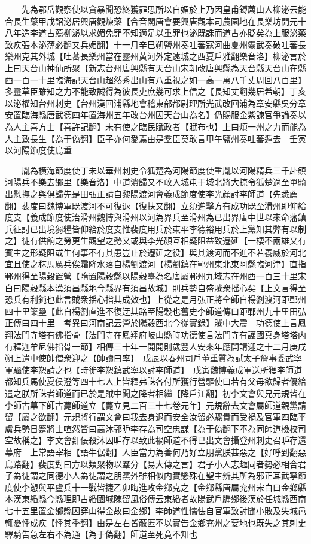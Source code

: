 　　先為鄂岳觀察使以貪暴聞恐終獲罪思所以自媚於上乃因皇甫鎛薦山人柳泌云能合長生藥甲戌詔泌居興唐觀煉藥【合音閣唐會要興唐觀本司農園地在長樂坊開元十八年造李道古薦柳泌以求媚免罪不知適足以重罪也泌既誅而道古亦貶矣為上服泌藥致疾張本泌薄必翻又兵媚翻】十一月辛巳朔鹽州奏吐蕃寇河曲夏州靈武奏破吐蕃長樂州克其外城【吐蕃長樂州當在靈州黄河外定遠城之西夏戶雅翻樂音洛】柳泌言於上曰天台山神仙所聚【新志台州唐興縣有天台山宋朝改唐興縣為天台縣天台山在縣西一百一十里臨海記天台山超然秀出山有八重視之如一高一萬八千丈周回八百里】多靈草臣雖知之力不能致誠得為彼長吏庶幾可求上信之【長知丈翻幾居希朝】丁亥以泌權知台州刺史【台州漢回浦縣地會稽東部都尉理所光武改回浦為章安縣吳分章安置臨海縣唐武德四年置海州五年改台州因天台山為名】仍賜服金紫諫官爭論奏以為人主喜方士【喜許記翻】未有使之臨民賦政者【賦布也】上曰煩一州之力而能為人主致長生【為于偽翻】臣子亦何愛焉由是羣臣莫敢言甲午鹽州奏吐蕃遁去　壬寅以河陽節度使烏重

　　胤為横海節度使丁未以華州刺史令狐楚為河陽節度使重胤以河陽精兵三千赴鎮河陽兵不樂去鄉里【樂音洛】中道潰歸又不敢入城屯于城北將大掠令狐楚適至單騎出慰撫之與俱歸先是田弘正請自黎陽渡河會義成節度使李光顔討李師道【先悉薦翻】裴度曰魏博軍既渡河不可復退【復扶又翻】立須進擊方有成功既至滑州即仰給度支【義成節度使治滑州魏博與滑州以河為界兵至滑州為已出界唐中世以來命藩鎮兵征討已出境芻糧皆仰給於度支惟裴度用兵於東平李德裕用兵於上黨知其弊有以制之】徒有供餉之勞更生觀望之勢又或與李光顔互相疑阻益致遷延【一棲不兩雄又有賓主之形疑阻或生何事不有其患豈止於遷延之役】與其渡河而不進不若養威於河北宜且使之秣馬厲兵俟霜降水落自楊劉渡河【楊劉鎮在鄆州東北東阿縣臨河津】直指鄆州得至陽穀置營【隋置陽穀縣以陽穀臺為名唐屬鄆州九域志在州西一百三十里宋白曰陽穀縣本漢須昌縣地今縣界有須昌故城】則兵勢自盛賊衆揺心矣【上文言得至恐兵有利鈍也此言賊衆揺心指其成效也】上從之是月弘正將全師自楊劉渡河距鄆州四十里築壘【此自楊劉直進不復迂其路至陽穀也舊史李師道傳曰距鄆州九十里田弘正傳曰四十里　考異曰河南記云營於陽穀西北今從實錄】賊中大震　功德使上言鳳翔法門寺塔有佛指骨【法門寺在鳳翔府岐山縣時功德使言法門寺有護國真身塔塔内有釋迦牟尼佛指骨一節】相傳三十年一開開則歲豐人安來年應開請迎之十二月庚戌朔上遣中使帥僧衆迎之【帥讀曰率】　戊辰以春州司戶董重質為試太子詹事委武寧軍驅使李愬請之也【時徙李愬鎮武寧以討李師道】　戊寅魏博義成軍送所獲李師道都知兵馬使夏侯澄等四十七人上皆釋弗誅各付所獲行營驅使曰若有父母欲歸者優給遣之朕所誅者師道而已於是賊中聞之降者相繼【降戶江翻】初李文會與兄元規皆在李師古幕下師古薨師道立【薨立見二百三十七卷元年】元規辭去文會屬師道親黨請留【屬之欲翻】元規將行謂文會曰我去身退而安全汝留必驟貴而受禍及官軍四臨平盧兵勢日蹙將士喧然皆曰高沐郭昈李存為司空忠謀【為于偽翻下不為同師道檢校司空故稱之】李文會姧佞殺沐囚昈存以致此禍師道不得已出文會攝登州刺史召昈存還幕府　上常語宰相【語牛倨翻】人臣當力為善何乃好立朋黨朕甚惡之【好呼到翻惡烏路翻】裴度對曰方以類聚物以羣分【易大傳之言】君子小人志趣同者勢必相合君子為徒謂之同德小人為徒謂之朋黨外雖相似内實懸殊在聖主辨其所為邪正耳武寧節度使李愬與平盧兵十一戰皆捷乙卯晦進攻金鄉克之【金鄉縣唐屬兖州宋白曰金鄉縣本漢東緍縣今縣理即古緍國城陳留風俗傳云東緍者故陽武戶牖鄉後漢於任城縣西南七十五里置金鄉縣因穿山得金故曰金鄉】李師道性懦怯自官軍致討聞小敗及失城邑輒憂悸成疾【悸其季翻】由是左右皆蔽匿不以實告金鄉兖州之要地也既失之其刺史驛騎告急左右不為通【為于偽翻】師道至死竟不知也

